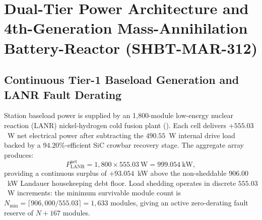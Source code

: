\documentclass[11pt,onecolumn]{article}
\begin{document}
\FloatBarrier
\section[Dual-Tier Power Architecture and SHBT-MAR-312]{Dual-Tier Power Architecture and 4th-Generation Mass-Annihilation Battery-Reactor (SHBT-MAR-312)}
\label{sec:isomer_battery_integration}

\FloatBarrier
\subsection{Continuous Tier-1 Baseload Generation and LANR Fault Derating}
Station baseload power is supplied by an 1,800-module low-energy nuclear reaction (LANR) nickel-hydrogen cold fusion plant (). Each cell delivers $+555.03$~W net electrical power after subtracting the $490.55$~W internal drive load backed by a $94.20\%$-efficient SiC crowbar recovery stage. The aggregate array produces:
\begin{equation}
P_{\text{LANR}}^{\text{net}} = 1{,}800 \times 555.03~\text{W} = 999.054~\text{kW},
\end{equation}
providing a continuous surplus of $+93.054$~kW above the non-sheddable $906.00$~kW Landauer housekeeping debt floor. Load shedding operates in discrete $555.03$~W increments: the minimum survivable module count is $N_{\min} = \lceil 906{,}000 / 555.03 \rceil = 1{,}633$ modules, giving an active zero-derating fault reserve of $N{+}167$ modules.
\end{document}
